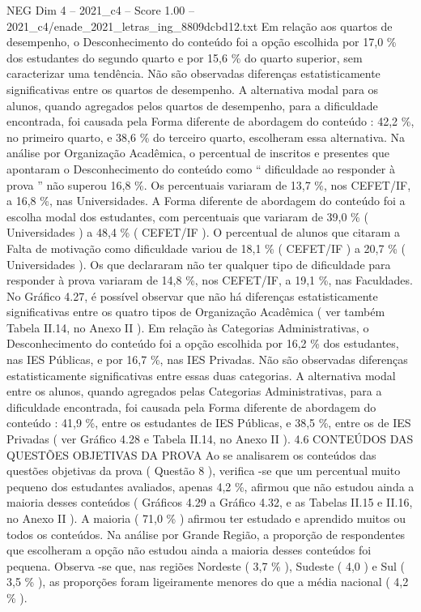 \begin{textsample}{NEG Dim 4 – 2021\_c4 – Score 1.00 – 2021\_c4/enade\_2021\_letras\_ing\_8809dcbd12.txt}
Em relação aos quartos de desempenho, o Desconhecimento do conteúdo foi a opção escolhida por 17,0 \% dos estudantes do segundo quarto e por 15,6 \% do quarto superior, sem caracterizar uma tendência.
Não são observadas diferenças estatisticamente significativas entre os quartos de desempenho.
A alternativa modal para os alunos, quando agregados pelos quartos de desempenho, para a dificuldade encontrada, foi causada pela Forma diferente de abordagem do conteúdo : 42,2 \%, no primeiro quarto, e 38,6 \% do terceiro quarto, escolheram essa alternativa.
Na análise por Organização Acadêmica, o percentual de inscritos e presentes que apontaram o Desconhecimento do conteúdo como “ dificuldade ao responder à prova ” não superou 16,8 \%.
Os percentuais variaram de 13,7 \%, nos CEFET/IF, a 16,8 \%, nas Universidades.
A Forma diferente de abordagem do conteúdo foi a escolha modal dos estudantes, com percentuais que variaram de 39,0 \% ( Universidades ) a 48,4 \% ( CEFET/IF ).
O percentual de alunos que citaram a Falta de motivação como dificuldade variou de 18,1 \% ( CEFET/IF ) a 20,7 \% ( Universidades ).
Os que declararam não ter qualquer tipo de dificuldade para responder à prova variaram de 14,8 \%, nos CEFET/IF, a 19,1 \%, nas Faculdades.
No Gráfico 4.27, é possível observar que não há diferenças estatisticamente significativas entre os quatro tipos de Organização Acadêmica ( ver também Tabela II.14, no Anexo II ).
Em relação às Categorias Administrativas, o Desconhecimento do conteúdo foi a opção escolhida por 16,2 \% dos estudantes, nas IES Públicas, e por 16,7 \%, nas IES Privadas.
Não são observadas diferenças estatisticamente significativas entre essas duas categorias.
A alternativa modal entre os alunos, quando agregados pelas Categorias Administrativas, para a dificuldade encontrada, foi causada pela Forma diferente de abordagem do conteúdo : 41,9 \%, entre os estudantes de IES Públicas, e 38,5 \%, entre os de IES Privadas ( ver Gráfico 4.28 e Tabela II.14, no Anexo II ). 4.6 CONTEÚDOS DAS QUESTÕES OBJETIVAS DA PROVA Ao se analisarem os conteúdos das questões objetivas da prova ( Questão 8 ), verifica -se que um percentual muito pequeno dos estudantes avaliados, apenas 4,2 \%, afirmou que não estudou ainda a maioria desses conteúdos ( Gráficos 4.29 a Gráfico 4.32, e as Tabelas II.15 e II.16, no Anexo II ).
A maioria ( 71,0 \% ) afirmou ter estudado e aprendido muitos ou todos os conteúdos.
Na análise por Grande Região, a proporção de respondentes que escolheram a opção não estudou ainda a maioria desses conteúdos foi pequena.
Observa -se que, nas regiões Nordeste ( 3,7 \% ), Sudeste ( 4,0 ) e Sul ( 3,5 \% ), as proporções foram ligeiramente menores do que a média nacional ( 4,2 \% ).

\end{textsample}
